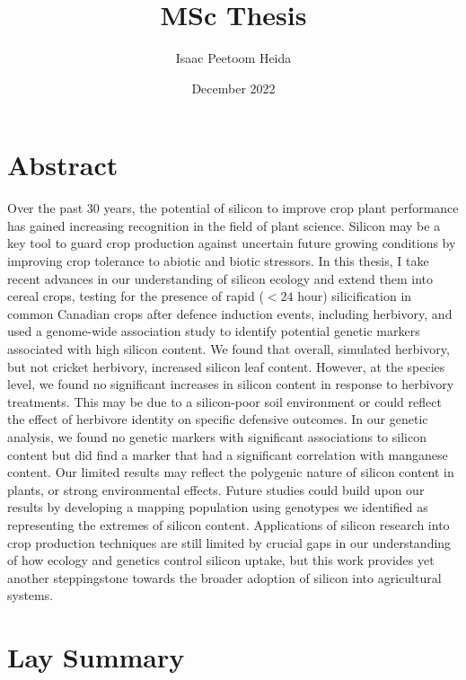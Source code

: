 \documentclass[12pt, letterpaper]{report}
\title{MSc Thesis}
\author{Isaac Peetoom Heida}
\date{December 2022}
\begin{document}
\setcounter{page}{2}







\chapter*{Abstract}

Over the past 30 years, the potential of silicon to improve crop plant performance has gained increasing recognition in the field of plant science. Silicon may be a key tool to guard crop production against uncertain future growing conditions by improving crop tolerance to abiotic and biotic stressors. In this thesis, I take recent advances in our understanding of silicon ecology and extend them into cereal crops, testing for the presence of rapid ($<24$ hour) silicification in common Canadian crops after defence induction events, including herbivory, and used a genome-wide association study to identify potential genetic markers associated with high silicon content. We found that overall, simulated herbivory, but not cricket herbivory, increased silicon leaf content. However, at the species level, we found no significant increases in silicon content in response to herbivory treatments. This may be due to a silicon-poor soil environment or could reflect the effect of herbivore identity on specific defensive outcomes. In our genetic analysis, we found no genetic markers with significant associations to silicon content but did find a marker that had a significant correlation with manganese content. Our limited results may reflect the polygenic nature of silicon content in plants, or strong environmental effects. Future studies could build upon our results by developing a mapping population using genotypes we identified as representing the extremes of silicon content. Applications of silicon research into crop production techniques are still limited by crucial gaps in our understanding of how ecology and genetics control silicon uptake, but this work provides yet another steppingstone towards the broader adoption of silicon into agricultural systems.

\chapter*{Lay Summary}
\end{document}
